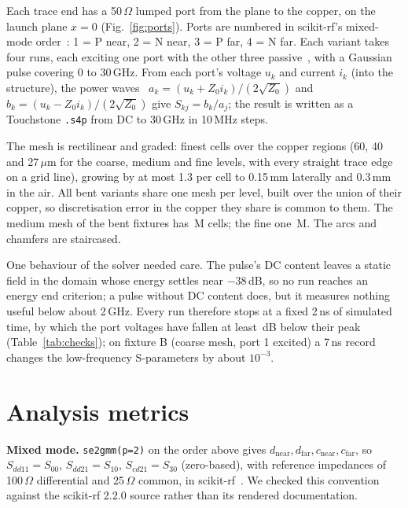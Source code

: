 \documentclass[10pt,twocolumn]{article}
\newcommand{\Sdd}[1]{S_{dd#1}}
\newcommand{\Scd}[1]{S_{cd#1}}
\begin{document}
Each trace end has a 50\,$\Omega$ lumped port from the plane to the copper, on the launch plane $x = 0$
(Fig.~\ref{fig:ports}). Ports are numbered in scikit-rf's mixed-mode order~\cite{skrf_se2gmm}: 1 = P near,
2 = N near, 3 = P far, 4 = N far. Each variant takes four runs, each exciting one port with the other three
passive~\cite{openems_ports}, with a Gaussian pulse covering 0 to 30\,GHz. From each port's voltage $u_k$ and
current $i_k$ (into the structure), the power waves~\cite{kurokawa1965}
$a_k = (u_k + Z_0 i_k)/(2\sqrt{Z_0})$ and $b_k = (u_k - Z_0 i_k)/(2\sqrt{Z_0})$ give $S_{kj} = b_k/a_j$; the
result is written as a Touchstone \texttt{.s4p} from DC to 30\,GHz in 10\,MHz steps.

The mesh is rectilinear and graded: finest cells over the copper regions (60, 40 and 27\,$\mu$m for the coarse,
medium and fine levels, with every straight trace edge on a grid line), growing by at most 1.3 per cell to
0.15\,mm laterally and 0.3\,mm in the air. All bent variants share one mesh per level, built over the union of
their copper, so discretisation error in the copper they share is common to them. The medium mesh of the bent
fixtures has \CellsMedium\,M cells; the fine one \CellsFine\,M. The arcs and chamfers are staircased.

One behaviour of the solver needed care. The pulse's DC content leaves a static field in the domain whose energy
settles near $-38$\,dB, so no run reaches an energy end criterion; a pulse without DC content does, but it
measures nothing useful below about 2\,GHz. Every run therefore stops at a fixed 2\,ns of simulated time, by which
the port voltages have fallen at least \TruncWorst\,dB below their peak (Table~\ref{tab:checks}); on fixture B
(coarse mesh, port 1 excited) a 7\,ns record changes the low-frequency S-parameters by about $10^{-3}$.

\section{Analysis metrics}
\label{sec:metrics}

\textbf{Mixed mode.} \texttt{se2gmm(p=2)} on the order above gives $d_\mathrm{near}, d_\mathrm{far},
c_\mathrm{near}, c_\mathrm{far}$, so $\Sdd{11}=S_{00}$, $\Sdd{21}=S_{10}$, $\Scd{21}=S_{30}$ (zero-based), with
reference impedances of 100\,$\Omega$ differential and 25\,$\Omega$ common, in scikit-rf~\cite{arsenovic2022}. We
checked this convention against the scikit-rf 2.2.0 source rather than its rendered documentation.
\end{document}
